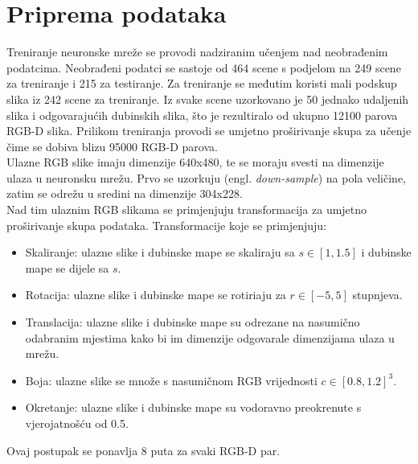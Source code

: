 \documentclass[times, utf8, zavrsni, numeric]{fer}
\begin{document}
\section{Priprema podataka}
Treniranje neuronske mreže se provodi nadziranim učenjem nad neobrađenim 
podatcima. Neobrađeni podatci se sastoje od 464 scene s podjelom na 249
scene za treniranje i 215 za testiranje. Za treniranje se međutim koristi 
mali podskup slika iz 242 scene za treniranje. Iz svake scene uzorkovano je 
50 jednako udaljenih slika i odgovarajućih dubinskih slika, što je rezultiralo
od ukupno 12100 parova RGB-D slika. Prilikom treniranja provodi se umjetno
proširivanje skupa za učenje čime se dobiva blizu 95000 RGB-D parova.
\\\indent Ulazne RGB slike imaju dimenzije 640x480, te se moraju svesti na 
dimenzije ulaza u neuronsku mrežu. Prvo se uzorkuju (engl. \textit{down-sample})
na pola veličine, zatim se odrežu u sredini na dimenzije 304x228.
\\\indent Nad tim ulaznim RGB slikama se primjenjuju transformacija za
umjetno proširivanje skupa podataka. Transformacije koje se primjenjuju:
\begin{itemize}
	\item Skaliranje: ulazne slike i dubinske mape se skaliraju sa 
	$s \in [1, 1.5]$ i dubinske mape se dijele sa $s$.
	\item Rotacija: ulazne slike i dubinske mape se rotiriaju za 
	$r \in [-5, 5]$ stupnjeva.
	\item Translacija: ulazne slike i dubinske mape su odrezane na
	nasumično odabranim mjestima kako bi im dimenzije odgovarale 
	dimenzijama ulaza u mrežu.
	\item Boja: ulazne slike se množe s nasumičnom RGB vrijednosti
	$c \in [0.8, 1.2]^3	$.
	\item Okretanje: ulazne slike i dubinske mape su vodoravno preokrenute
	s vjerojatnošću od 0.5.
\end{itemize}
Ovaj postupak se ponavlja 8 puta za svaki RGB-D par.
\end{document}
